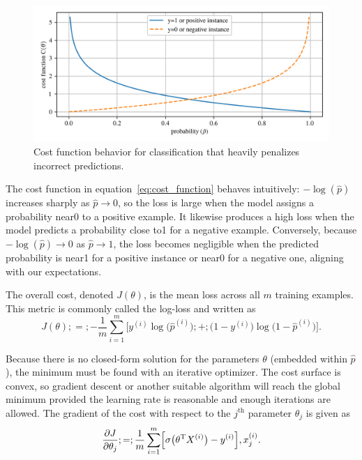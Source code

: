\documentclass[12pt,letter]{article}
\begin{document}
\begin{figure}[H]
	\centering
	\includegraphics[width=5.5in]{../figures/Logistic_Regression_cost_function.png}
	\caption{Cost function behavior for classification that heavily penalizes incorrect predictions.}
	\label{fig:Logistic_Regression_cost_function}
\end{figure}

The cost function in equation~\ref{eq:cost_function} behaves intuitively: $-\log(\hat{p})$ increases sharply as $\hat{p} \to 0$, so the loss is large when the model assigns a probability near0 to a positive example. It likewise produces a high loss when the model predicts a probability close to1 for a negative example. Conversely, because $-\log(\hat{p})\to0$ as $\hat{p} \to 1$, the loss becomes negligible when the predicted probability is near1 for a positive instance or near0 for a negative one, aligning with our expectations.



The overall cost, denoted $J(\theta)$, is the mean loss across all $m$ training examples. This metric is commonly called the log-loss and written as 
\begin{equation}
J(\theta) ;=; -\frac{1}{m}\sum_{i=1}^{m}\Big[y^{(i)} \log \bigl(\hat{p}^{(i)}\bigr) ;+; \bigl(1 - y^{(i)}\bigr) \log \bigl(1-\hat{p}^{(i)}\bigr)\Big].
\label{eq:log_loss}
\end{equation}

Because there is no closed-form solution for the parameters $\theta$ (embedded within $\hat{p}$), the minimum must be found with an iterative optimizer. The cost surface is convex, so gradient descent or another suitable algorithm will reach the global minimum provided the learning rate is reasonable and enough iterations are allowed. The gradient of the cost with respect to the $j^\text{th}$ parameter $\theta_j$ is given as
\begin{equation}
\frac{\partial J}{\partial \theta_j} ;=; \frac{1}{m} \sum_{i=1}^{m} \Bigl[\sigma \bigl(\theta^\text{T}X^{(i)}\bigr) - y^{(i)}\Bigr],x^{(i)}_{j}.
\label{eq:Logistic_cost_function_partial_derivatives}
\end{equation}
\end{document}
